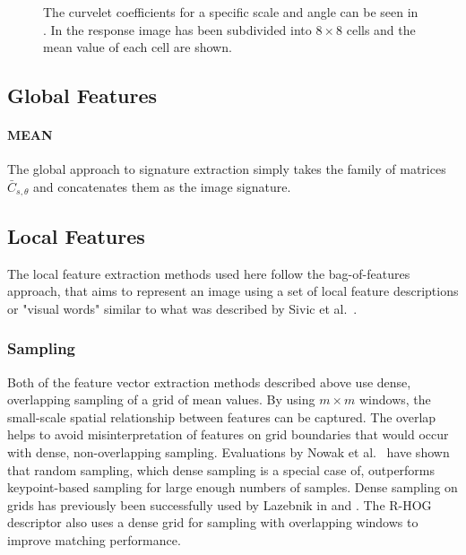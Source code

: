 \begin{figure}[h]
    \centering
    \quad
    \caption[Curvelet coefficients and means]{
        The curvelet coefficients for a specific scale and angle can be seen in
        . In
         the response image has
        been subdivided into $8 \times 8$ cells and the mean value of each cell
        are shown.
    }
    \label{fig:signature_examples}
\end{figure}

\subsection{Global Features}

\paragraph{MEAN}

The global approach to signature extraction simply takes the family of matrices
$\bar{C}_{s, \theta}$ and concatenates them as the image signature.

\subsection{Local Features}

The local feature extraction methods used here follow the bag-of-features
approach, that aims to represent an image using a set of local feature
descriptions or "visual words" similar to what was described by Sivic et al.\ 
\autocite{sivic_video_2003}. 

\subsubsection{Sampling}

Both of the feature vector extraction methods described above use dense,
overlapping sampling of a grid of mean values. By using $m \times m$ windows,
the small-scale spatial relationship between features can be captured. The
overlap helps to avoid misinterpretation of features on grid boundaries that
would occur with dense, non-overlapping sampling. Evaluations by Nowak et al.\
\autocite{nowak_sampling_2006} have shown that random sampling, which dense
sampling is a special case of, outperforms keypoint-based sampling for large
enough numbers of samples. Dense sampling on grids has previously been
successfully used by Lazebnik in \autocite{lazebnik_beyond_2006} and
\autocite{lazebnik_spatial_2009}. The R-HOG descriptor
\autocite{dalal_histograms_2005} also uses a dense grid for sampling with
overlapping windows to improve matching performance.

